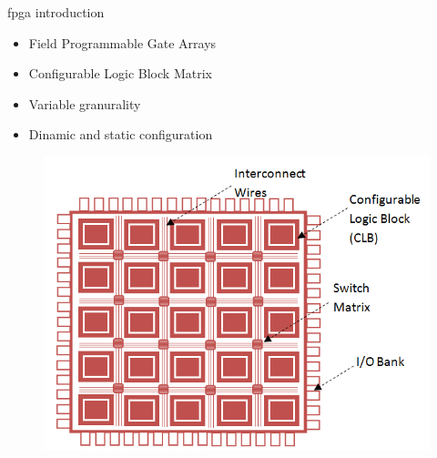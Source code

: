 \begin{frame}{\acrshort{fpga} introduction}
    \begin{itemize}
        \item Field Programmable Gate Arrays
        \item Configurable Logic Block Matrix
        \item Variable granurality
        \item Dinamic and static configuration
    \end{itemize}
    \begin{figure}[!ht]
    \includegraphics[width=0.5\linewidth]{images/FPGA-Architecture.png}
    \end{figure}
\end{frame}





